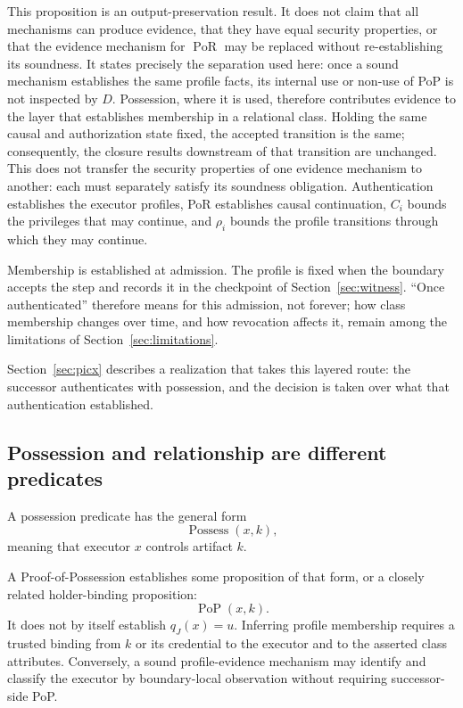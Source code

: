 \documentclass[10pt,twocolumn]{article}
\newcommand{\PoR}{\operatorname{PoR}}
\newcommand{\PoP}{\operatorname{PoP}}
\begin{document}
This proposition is an output-preservation result. It does not claim that all
mechanisms can produce evidence, that they have equal security properties, or
that the evidence mechanism for \(\PoR\) may be replaced without re-establishing
its soundness. It states precisely the separation used here: once a sound
mechanism establishes the same profile facts, its internal use or non-use of
PoP is not inspected by \(D\). Possession, where it is used, therefore
contributes evidence to the layer that establishes membership in a relational
class. Holding the same causal and authorization state fixed, the accepted
transition is the same; consequently, the closure results downstream of that
transition are unchanged. This does not transfer the security properties of one
evidence mechanism to another: each must separately satisfy its soundness
obligation. Authentication establishes the executor profiles, PoR establishes
causal continuation, \(C_i\) bounds the privileges that may continue, and
\(\rho_i\) bounds the profile transitions through which they may continue.

Membership is established at admission. The profile is fixed when the boundary
accepts the step and records it in the checkpoint of
Section~\ref{sec:witness}. ``Once authenticated'' therefore means for this
admission, not forever; how class membership changes over time, and how
revocation affects it, remain among the limitations of
Section~\ref{sec:limitations}.

Section~\ref{sec:picx} describes a realization that takes this layered route:
the successor authenticates with possession, and the decision is taken over
what that authentication established.

\subsection{Possession and relationship are different predicates}

A possession predicate has the general form
\[
\operatorname{Possess}(x,k),
\]
meaning that executor \(x\) controls artifact \(k\).

A Proof-of-Possession establishes some proposition of that form, or a closely
related holder-binding proposition:
\[
\PoP(x,k).
\]
It does not by itself establish \(q_J(x)=u\). Inferring profile membership
requires a trusted binding from \(k\) or its credential to the executor and to
the asserted class attributes. Conversely, a sound profile-evidence mechanism
may identify and classify the executor by boundary-local observation without
requiring successor-side PoP.
\end{document}

